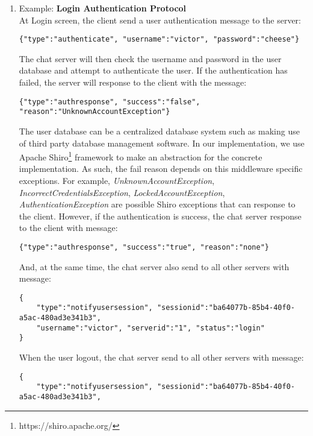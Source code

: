 \documentclass[dareport.tex]{subfiles}
\begin{document}
\begin{enumerate}[leftmargin=*]
\item Example: \textbf{Login Authentication Protocol}
\\
At Login screen, the client send a user authentication message to the server:
\begin{small}
\begin{verbatim}
{"type":"authenticate", "username":"victor", "password":"cheese"}
\end{verbatim}
\end{small}
The chat server will then check the username and password in the user database and attempt to authenticate the user. If the authentication has failed, the server will response to the client with the message:
\begin{small}
\begin{verbatim}
{"type":"authresponse", "success":"false", "reason":"UnknownAccountException"}
\end{verbatim}
\end{small}
The user database can be a centralized database system such as making use of third party database management software. In our implementation, we use Apache Shiro\footnote{https://shiro.apache.org/} framework to make an abstraction for the concrete implementation. As such, the fail reason depends on this middleware specific exceptions. For example, \textit{UnknownAccountException}, \textit{IncorrectCredentialsException}, \textit{LockedAccountException}, \textit{AuthenticationException} are possible Shiro exceptions that can response to the client.
However, if the authentication is success, the chat server response to the client with message:
\begin{small}
\begin{verbatim}
{"type":"authresponse", "success":"true", "reason":"none"}
\end{verbatim}
\end{small}
And, at the same time, the chat server also send to all other servers with message:
\begin{small}
\begin{verbatim}
{
    "type":"notifyusersession", "sessionid":"ba64077b-85b4-40f0-a5ac-480ad3e341b3", 
    "username":"victor", "serverid":"1", "status":"login"
}
\end{verbatim}
\end{small}
When the user logout, the chat server send to all other servers with message:
\begin{small}
\begin{verbatim}
{
    "type":"notifyusersession", "sessionid":"ba64077b-85b4-40f0-a5ac-480ad3e341b3",

\end{verbatim}
\end{small}
\end{enumerate}
\end{document}
